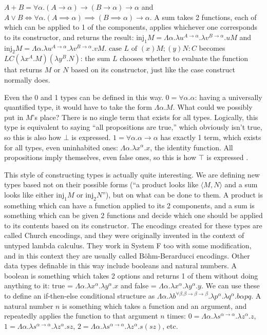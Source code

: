 \documentclass[12pt]{article}
\begin{document}
$A + B = \forall \alpha. (A \to \alpha) \to (B \to \alpha) \to \alpha$ and $A \lor B \iff \forall \alpha. (A \implies \alpha) \implies (B \implies \alpha) \to \alpha$. A sum takes 2 functions, each of which can be applied to 1 of the components, applies whichever one corresponds to its constructor, and returns the result: $\text{inj}_1 M = \Lambda \alpha. \lambda u^{A \to \alpha}. \lambda v^{B \to \alpha}. uM$ and $\text{inj}_2 M = \Lambda \alpha. \lambda u^{A \to \alpha}. \lambda v^{B \to \alpha}. vM$. $\text{case }L\text{ of }(x)M; (y)N: C$ becomes $L C (\lambda x^A. M)(\lambda y^B. N)$: the sum $L$ chooses whether to evaluate the function that returns $M$ or $N$ based on its constructor, just like the case construct normally does.


Even the 0 and 1 types can be defined in this way. $0 = \forall \alpha. \alpha$: having a universally quantified type, it would have to take the form $\Lambda \alpha. M$. What could we possibly put in $M$'s place? There is no single term that exists for all types. Logically, this type is equivalent to saying ``all propositions are true,'' which obviously isn't true, so this is also how $\bot$ is expressed. $1 = \forall \alpha. \alpha \to \alpha$ has exactly 1 term, which exists for all types, even uninhabited ones: $\Lambda \alpha. \lambda x^\alpha.x$, the identity function. All propositions imply themselves, even false ones, so this is how $\top$ is expressed \cite{sorensen}.

This style of constructing types is actually quite interesting. We are defining new types based not on their possible forms (``a product looks like $\langle M, N \rangle$ and a sum looks like either $\text{inj}_1 M$ or $\text{inj}_2N $''), but on what can be done to them. A product is something which can have a function applied to its 2 components, and a sum is something which can be given 2 functions and decide which one should be applied to its contents based on its constructor. The encodings created for these types are called Church encodings, and they were originally invented in the context of untyped lambda calculus. They work in System F too with some modification, and in this context they are usually called B\"{o}hm-Berarducci encodings. Other data types definable in this way include booleans and natural numbers. A boolean is something which takes 2 options and returns 1 of them without doing anything to it: true = $\Lambda \alpha. \lambda x^\alpha. \lambda y^\alpha. x$ and false = $\Lambda \alpha. \lambda x^\alpha. \lambda y^\alpha. y$. We can use these to define an if-then-else conditional structure as $\Lambda \alpha. \lambda b^{\forall \beta. \beta \to \beta \to \beta}. \lambda p^\alpha. \lambda q^\alpha. b\alpha pq$. A natural number $n$ is something which takes a function and an argument, and repeatedly applies the function to that argument $n$ times: $0 = \Lambda \alpha.\lambda s^{\alpha \to \alpha}. \lambda z^\alpha. z$, $1 = \Lambda \alpha. \lambda s^{\alpha \to \alpha}. \lambda z^\alpha. sz$, $2 = \Lambda \alpha. \lambda s^{\alpha \to \alpha}. \lambda z^\alpha. s(sz)$, etc.
\end{document}
